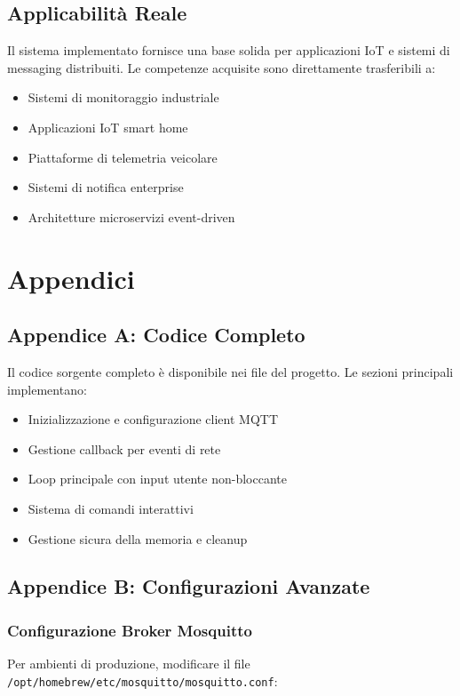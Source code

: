 \documentclass[12pt,a4paper]{article}
\begin{document}
\subsection{Applicabilità Reale}
Il sistema implementato fornisce una base solida per applicazioni IoT e sistemi di messaging distribuiti. Le competenze acquisite sono direttamente trasferibili a:

\begin{itemize}
    \item Sistemi di monitoraggio industriale
    \item Applicazioni IoT smart home
    \item Piattaforme di telemetria veicolare
    \item Sistemi di notifica enterprise
    \item Architetture microservizi event-driven
\end{itemize}

\section{Appendici}

\subsection{Appendice A: Codice Completo}

Il codice sorgente completo è disponibile nei file del progetto. Le sezioni principali implementano:

\begin{itemize}
    \item Inizializzazione e configurazione client MQTT
    \item Gestione callback per eventi di rete
    \item Loop principale con input utente non-bloccante
    \item Sistema di comandi interattivi
    \item Gestione sicura della memoria e cleanup
\end{itemize}

\subsection{Appendice B: Configurazioni Avanzate}

\subsubsection{Configurazione Broker Mosquitto}
Per ambienti di produzione, modificare il file \texttt{/opt/homebrew/etc/mosquitto/mosquitto.conf}:
\end{document}
